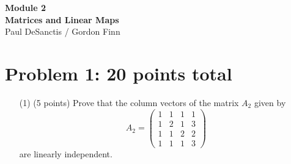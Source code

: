\documentclass[12pt]{article}
\begin{document}
\begin{center}

{\Large\bf Module 2\\
\vspace{0.5cm}
Matrices and Linear Maps}\\[10pt]
Paul DeSanctis / Gordon Finn
\end{center}

\section*{Problem 1: 20 points total}
\label{prob-3.2}
\begin{itemize}
\item[(1)](5 points)
Prove that the column vectors of the matrix $A_2$ given by 
\[
A_2 = 
\begin{pmatrix}
1 & 1 & 1 & 1\\
1 & 2 & 1 & 3 \\
1 & 1 & 2 & 2 \\
1 & 1 & 1 & 3
\end{pmatrix}
\]
are linearly  independent.
\newline 



\end{itemize}
\end{document}
